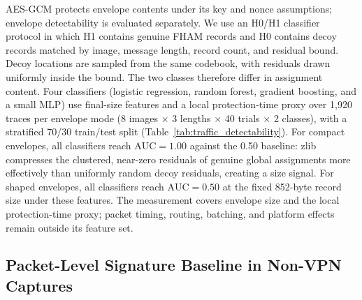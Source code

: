 \documentclass[preprint,12pt]{elsarticle}
\theoremstyle{plain}
\begin{document}
AES-GCM protects envelope contents under its key and nonce assumptions;
envelope detectability is evaluated separately. We use an H0/H1 classifier
protocol in which H1 contains genuine FHAM records and H0 contains decoy
records matched by image, message length, record count, and residual bound.
Decoy locations are sampled from the same codebook, with residuals drawn
uniformly inside the bound. The two classes therefore differ in assignment
content. Four classifiers (logistic regression, random forest, gradient
boosting, and a small MLP) use final-size features and a local protection-time
proxy over 1,920 traces per envelope mode (8 images $\times$ 3 lengths
$\times$ 40 trials $\times$ 2 classes), with a stratified 70/30 train/test
split (Table~\ref{tab:traffic_detectability}). For compact envelopes, all
classifiers reach $\mathrm{AUC}=1.00$ against the 0.50 baseline: zlib
compresses the clustered, near-zero residuals of genuine global assignments
more effectively than uniformly random decoy residuals, creating a size
signal. For shaped envelopes, all classifiers reach $\mathrm{AUC}=0.50$ at
the fixed 852-byte record size under these features. The measurement covers
envelope size and the local protection-time proxy; packet timing, routing,
batching, and platform effects remain outside its feature set.

\begin{table}[!t]
\centering
\caption{H0/H1 Traffic Detectability by Envelope Mode (1920 Traces per Mode, 70/30 Train/Test Split)}
\label{tab:traffic_detectability}
{\small\setlength{\tabcolsep}{4pt}}
\end{table}

\subsection{Packet-Level Signature Baseline in Non-VPN Captures}
\end{document}

